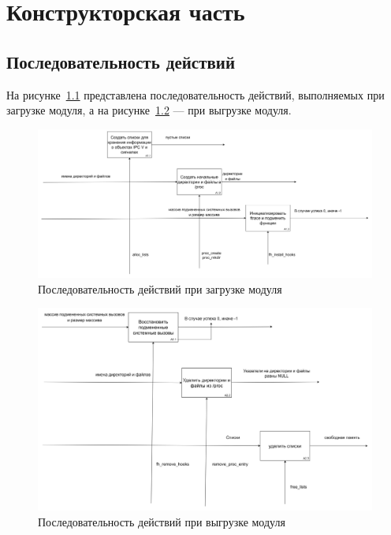 \chapter{Конструкторская часть}

\section{Последовательность действий}

На рисунке~\ref{img:alg:idef0-1} представлена последовательность действий, выполняемых при загрузке модуля, а на рисунке~\ref{img:alg:idef0-2} --- при выгрузке модуля.

\begin{figure}[h]
	\centering
	\includegraphics[height=0.3\textheight]{img/idef0-1.png}
	\caption{Последовательность действий при загрузке модуля}
	\label{img:alg:idef0-1}
\end{figure}

\begin{figure}[h]
	\centering
	\includegraphics[height=0.3\textheight]{img/idef0-2.png}
	\caption{Последовательность действий при выгрузке модуля}
	\label{img:alg:idef0-2}
\end{figure}


